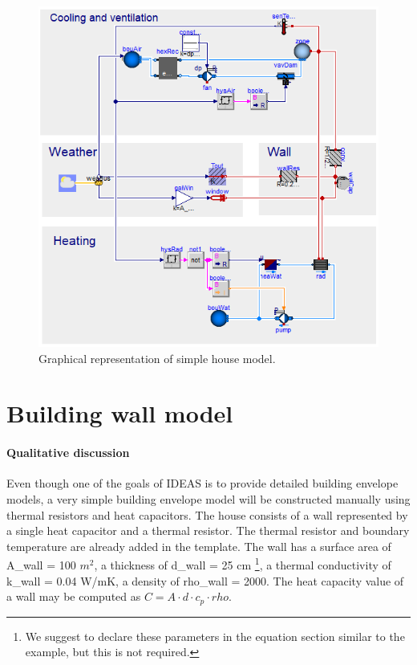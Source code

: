 \documentclass[10pt,a4paper]{article}
\begin{document}
\begin{figure}[h!]
\centering
\includegraphics[scale=0.46]{simpleHouse.png}
\caption{Graphical representation of simple house model.}
\label{fig:simpleHouse}
\end{figure}


\section{Building wall model}
\paragraph{Qualitative discussion}
Even though one of the goals of IDEAS is to provide
detailed building envelope models, a very simple building
envelope model will be constructed manually using thermal
resistors and heat capacitors.
The house consists of a wall represented 
by a single heat capacitor and a thermal resistor. 
The thermal resistor and boundary temperature 
are already added in the template.
The wall has a surface area of A\_wall = 100 $m^2$, 
a thickness of d\_wall = 25 cm
\footnote{We suggest to declare these parameters in the equation section similar to the example, but this is not required.}, 
a thermal conductivity of k\_wall = 0.04 W/mK, 
a density of rho\_wall = 2000.
The heat capacity value of a wall may be computed as $C=A\cdot d \cdot c_p \cdot rho$.
\end{document}
